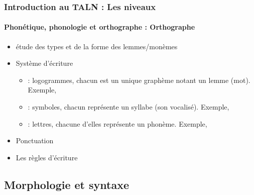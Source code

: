 \documentclass{beamer}
\begin{document}
\begin{frame}
\frametitle{Introduction au TALN : Les niveaux}
\framesubtitle{Phonétique, phonologie et orthographe : Orthographe}

\begin{itemize}
	\item étude des types et de la forme des lemmes/monèmes 
	\item Système d'écriture
	\begin{itemize}
		\item {} : logogrammes, chacun est un unique graphème notant un lemme (mot).
		Exemple, 
		\item {} : symboles, chacun représente un syllabe (son vocalisé). 
		Exemple, 
		\item {} : lettres, chacune d'elles représente un phonème. 
		Exemple, 
	\end{itemize}
	\item Ponctuation 
	\item Les règles d'écriture 
\end{itemize}

\end{frame}

\subsection{Morphologie et syntaxe}
\end{document}
